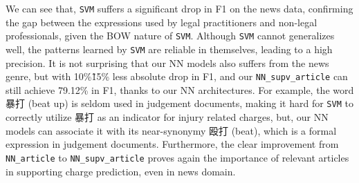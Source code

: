 We can see that, \texttt{SVM} suffers a significant drop in F1 on the news data, %
confirming the gap between the expressions used by legal practitioners and non-legal professionals, 
given the BOW nature of  \texttt{SVM}.
Although \texttt{SVM} cannot generalizes well, the patterns learned by \texttt{SVM} are reliable in themselves, leading to a high precision.
It is not surprising that our NN models  also suffers from the news genre, but with 10\%\~15\% less absolute drop in F1, and our  \texttt{NN\_supv\_article} can still achieve 79.12\% in F1, thanks to  our NN architectures. 
For example, the word 暴打 (beat up) is seldom used in judgement documents, 
making it hard for \texttt{SVM} to correctly utilize  暴打 as an indicator for injury related charges, but, %
our NN models can associate it with its  near-synonymy  殴打 (beat), which is a formal expression in judgement documents.
Furthermore, the clear improvement from \texttt{NN\_article} to \texttt{NN\_supv\_article} proves again the importance of  relevant articles 
in supporting charge prediction, even in news domain. 




